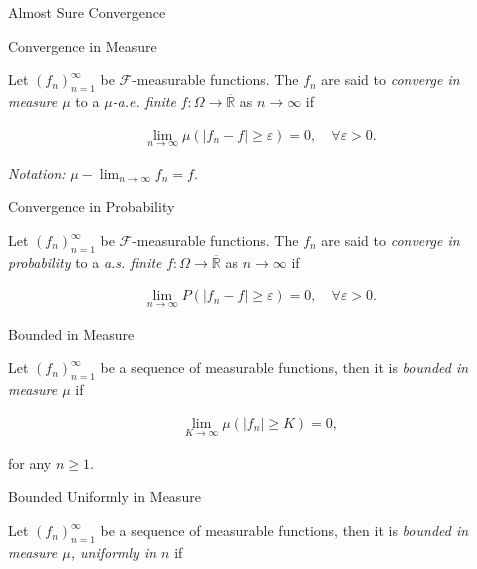 \documentclass[10pt,landscape]{article}
\renewcommand{\geq}{\geqslant}
\newcommand{\CalF}{\mathcal{F}}
\begin{document}
\begin{multicols}{3}
\begin{definition}{5.1}{Almost Sure Convergence}
\end{definition}

\begin{definition}{5.2}{Convergence in Measure}

    Let $(f_n)_{n=1}^{\infty}$ be $\CalF$-measurable functions. The $f_n$ are said to \emph{converge in measure $\mu$} to a \emph{$\mu$-a.e. finite} $f: \Omega \to \overline{\mathbb{R}}$ as $n \to \infty$ if

        \begin{align*}
            \lim_{n \to \infty} \mu(|f_n - f| \geq \varepsilon) = 0, \quad \forall \varepsilon > 0.
        \end{align*}

    \emph{Notation:} $\mu-\lim_{n \to \infty} f_n = f$.

\end{definition}

\begin{definition}{5.2}{Convergence in Probability}

    Let $(f_n)_{n=1}^{\infty}$ be $\CalF$-measurable functions. The $f_n$ are said to \emph{converge in probability} to a \emph{a.s. finite} $f: \Omega \to \overline{\mathbb{R}}$ as $n \to \infty$ if

        \begin{align*}
            \lim_{n \to \infty} P(|f_n - f| \geq \varepsilon) = 0, \quad \forall \varepsilon > 0.
        \end{align*}

\end{definition}

\begin{definition}{}{Bounded in Measure}

    Let $(f_n)_{n=1}^{\infty}$ be a sequence of measurable functions, then it is \emph{bounded in measure $\mu$} if

        \begin{align*}
            \lim_{K \to \infty} \mu(|f_n| \geq K) = 0,
        \end{align*}

    for any $n \geq 1$.

\end{definition}

\begin{definition}{}{Bounded Uniformly in Measure}

    Let $(f_n)_{n=1}^{\infty}$ be a sequence of measurable functions, then it is \emph{bounded in measure $\mu$, uniformly in $n$} if


\end{definition}
\end{multicols}
\end{document}

